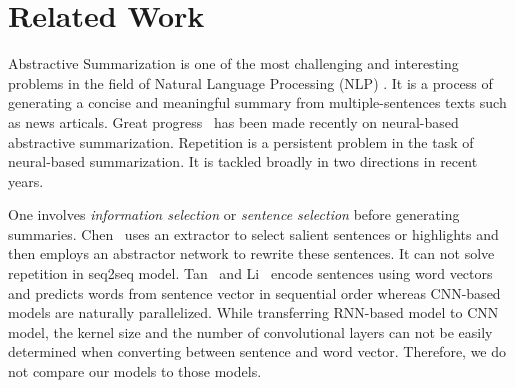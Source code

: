 \section{Related Work}
\label{sec:related}

Abstractive Summarization
is one of the most challenging and interesting problems 
in the field of Natural Language Processing (NLP)
\cite{CareniniC08,PallottaDB09,SankarasubramaniamRG14,BingLLLGP15,RushCW15,LiHZ16,YaoWX17,MohamedO19,LierdeC19,NguyenCNN19}.
It is a process of generating a concise and meaningful summary 
from multiple-sentences texts
such as news articals.
Great progress~
\cite{RushCW15,ChopraAR16,NallapatiZSGX16,SeeLM17,PaulusXS17,HardyV18,KourisAS19,LiuL19,ZhangWZ19,WangQW19}
has been made recently on
neural-based abstractive summarization.
Repetition is a persistent problem in the task of 
neural-based summarization. 
It is tackled broadly in two directions in recent years. 

One involves {\em information selection} or 
{\em sentence selection} before generating summaries.
Chen~\cite{P18-1063} uses an extractor  
to select salient sentences or highlights and then employs 
an abstractor network to rewrite these sentences.
It can not solve repetition in seq2seq model.
Tan~\cite{TanWX17} and Li~\cite{D18-1205,D18-1441} encode
sentences using word vectors
and predicts words from sentence vector in sequential order 
whereas CNN-based models are naturally parallelized. 
While transferring RNN-based model to CNN model, 
the kernel size and the number of 
convolutional layers can not be easily determined when
converting between sentence and word vector. 
Therefore, we do not compare our models to those models. 

